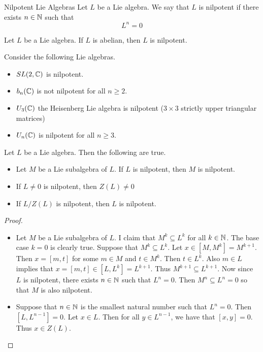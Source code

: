 \documentclass[a4paper]{article}
\begin{document}
\begin{defn}{Nilpotent Lie Algebras}{} Let $L$ be a Lie algebra. We say that $L$ is nilpotent if there exists $n\in\mathbb{N}$ such that $$L^n=0$$
\end{defn}

\begin{lmm}{}{} Let $L$ be a Lie algebra. If $L$ is abelian, then $L$ is nilpotent. 
\end{lmm}

\begin{eg}{}{} Consider the following Lie algebras. 
\begin{itemize}
\item $SL(2,\mathbb{C})$ is nilpotent. 
\item $b_n(\mathbb{C})$ is not nilpotent for all $n\geq 2$. 
\item $U_3(\mathbb{C})$ the Heisenberg Lie algebra is nilpotent ($3\times 3$ strictly upper triangular matrices)
\item $U_n(\mathbb{C})$ is nilpotent for all $n\geq 3$. 
\end{itemize}
\end{eg}

\begin{lmm}{}{} Let $L$ be a Lie algebra. Then the following are true. 
\begin{itemize}
\item Let $M$ be a Lie subalgebra of $L$. If $L$ is nilpotent, then $M$ is nilpotent. 
\item If $L\neq 0$ is nilpotent, then $Z(L)\neq 0$
\item If $L/Z(L)$ is nilpotent, then $L$ is nilpotent. 
\end{itemize} \tcbline
\begin{proof}~\\
\begin{itemize}
\item Let $M$ be a Lie subalgebra of $L$. I claim that $M^k\subseteq L^k$ for all $k\in\mathbb{N}$. The base case $k=0$ is clearly true. Suppose that $M^k\subseteq L^k$. Let $x\in[M,M^k]=M^{k+1}$. Then $x=[m,t]$ for some $m\in M$ and $t\in M^k$. Then $t\in L^k$. Also $m\in L$ implies that $x=[m,t]\in[L,L^k]=L^{k+1}$. Thus $M^{k+1}\subseteq L^{k+1}$. Now since $L$ is nilpotent, there exists $n\in\mathbb{N}$ such that $L^n=0$. Then $M^n\subseteq L^n=0$ so that $M$ is also nilpotent. 
\item Suppose that $n\in\mathbb{N}$ is the smallest natural number such that $L^n=0$. Then $[L,L^{n-1}]=0$. Let $x\in L$. Then for all $y\in L^{n-1}$, we have that $[x,y]=0$. Thus $x\in Z(L)$. 
\end{itemize}
\end{proof}
\end{lmm}
\end{document}
